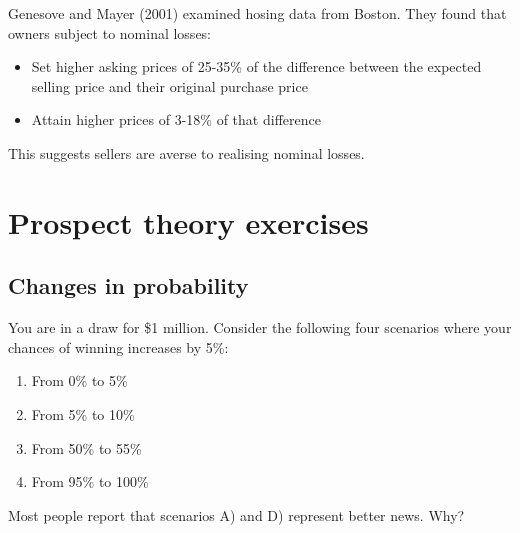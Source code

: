 \documentclass[
  letterpaper,
  DIV=11,
  numbers=noendperiod]{scrreprt}
\providecommand{\tightlist}{%
  \setlength{\itemsep}{0pt}\setlength{\parskip}{0pt}}\usepackage{longtable,booktabs,array}
\begin{document}
Genesove and Mayer (2001) examined hosing data from Boston. They found
that owners subject to nominal losses:

\begin{itemize}
\tightlist
\item
  Set higher asking prices of 25-35\% of the difference between the
  expected selling price and their original purchase price
\item
  Attain higher prices of 3-18\% of that difference
\end{itemize}

This suggests sellers are averse to realising nominal losses.

\hypertarget{prospect-theory-exercises}{%
\chapter{Prospect theory exercises}\label{prospect-theory-exercises}}

\hypertarget{changes-in-probability}{%
\section{Changes in probability}\label{changes-in-probability}}

You are in a draw for \$1 million. Consider the following four scenarios
where your chances of winning increases by 5\%:

\begin{enumerate}
\def\labelenumi{\Alph{enumi})}
\tightlist
\item
  From 0\% to 5\%
\item
  From 5\% to 10\%
\item
  From 50\% to 55\%
\item
  From 95\% to 100\%
\end{enumerate}

Most people report that scenarios A) and D) represent better news. Why?
\end{document}
